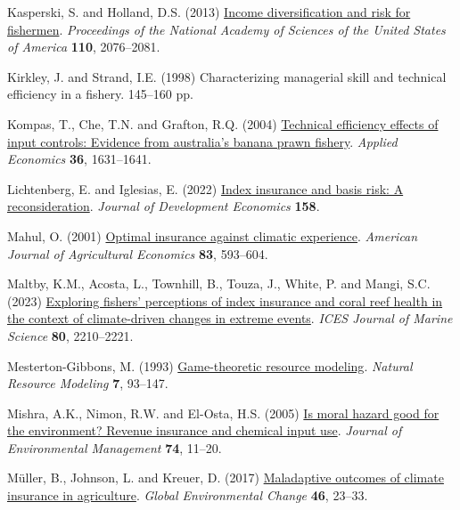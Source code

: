 \documentclass[
  letterpaper,
  DIV=11,
  numbers=noendperiod]{scrartcl}
\newlength{\cslhangindent}
\newenvironment{CSLReferences}[2] %
 {\begin{list}{}{%
  \setlength{\itemindent}{0pt}
  \setlength{\leftmargin}{0pt}
  \setlength{\parsep}{0pt}
  \ifodd #1
   \setlength{\leftmargin}{\cslhangindent}
   \setlength{\itemindent}{-1\cslhangindent}
  \fi
  \setlength{\itemsep}{#2\baselineskip}}}
 {\end{list}}
\theoremstyle{plain}
\theoremstyle{plain}
\theoremstyle{remark}
\begin{document}
\begin{CSLReferences}{1}{0}
Kasperski, S. and Holland, D.S. (2013)
\href{https://doi.org/10.1073/pnas.1212278110}{Income diversification
and risk for fishermen}. \emph{Proceedings of the National Academy of
Sciences of the United States of America} \textbf{110}, 2076--2081.

Kirkley, J. and Strand, I.E. (1998) Characterizing managerial skill and
technical efficiency in a fishery. 145--160 pp.

Kompas, T., Che, T.N. and Grafton, R.Q. (2004)
\href{https://doi.org/10.1080/0003684042000218561}{Technical efficiency
effects of input controls: Evidence from australia's banana prawn
fishery}. \emph{Applied Economics} \textbf{36}, 1631--1641.

Lichtenberg, E. and Iglesias, E. (2022)
\href{https://doi.org/10.1016/j.jdeveco.2022.102883}{Index insurance and
basis risk: A reconsideration}. \emph{Journal of Development Economics}
\textbf{158}.

Mahul, O. (2001) \href{https://doi.org/10.1111/0002-9092.00180}{Optimal
insurance against climatic experience}. \emph{American Journal of
Agricultural Economics} \textbf{83}, 593--604.

Maltby, K.M., Acosta, L., Townhill, B., Touza, J., White, P. and Mangi,
S.C. (2023) \href{https://doi.org/10.1093/icesjms/fsac003}{Exploring
fishers' perceptions of index insurance and coral reef health in the
context of climate-driven changes in extreme events}. \emph{ICES Journal
of Marine Science} \textbf{80}, 2210--2221.

Mesterton-Gibbons, M. (1993)
\href{https://doi.org/10.1111/j.1939-7445.1993.tb00143.x}{Game-theoretic
resource modeling}. \emph{Natural Resource Modeling} \textbf{7},
93--147.

Mishra, A.K., Nimon, R.W. and El-Osta, H.S. (2005)
\href{https://doi.org/10.1016/j.jenvman.2004.08.003}{Is moral hazard
good for the environment? Revenue insurance and chemical input use}.
\emph{Journal of Environmental Management} \textbf{74}, 11--20.

Müller, B., Johnson, L. and Kreuer, D. (2017)
\href{https://doi.org/10.1016/j.gloenvcha.2017.06.010}{Maladaptive
outcomes of climate insurance in agriculture}. \emph{Global
Environmental Change} \textbf{46}, 23--33.


\end{CSLReferences}
\end{document}
